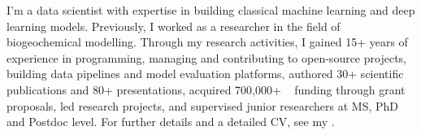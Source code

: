 \documentclass[
	a4paper,
]{fortysecondscv}
\begin{document}
\makefrontsidebar


I'm a data scientist with expertise in building classical machine learning and deep learning models. Previously, I worked as a researcher in the field of biogeochemical modelling. Through my research activities, I gained 15+ years of experience in programming, managing and contributing to open-source projects, building data pipelines and model evaluation platforms, authored 30+ scientific publications and 80+  presentations, acquired 700,000+ \texteuro~ funding through grant proposals, led research projects, and supervised junior researchers at MS, PhD and Postdoc level. For further details and a detailed CV, see my \href{https://sites.google.com/view/onur-kerimoglu}{\color{pblue}{website}}.



           
\end{document}
